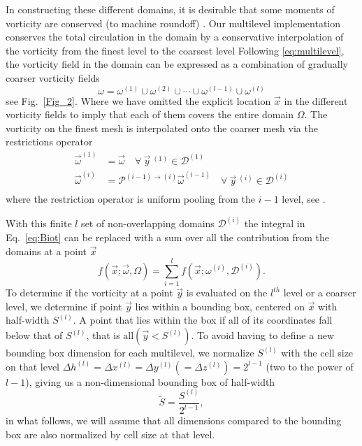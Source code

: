 \documentclass[preprint,12pt]{elsarticle}
\begin{document}
In constructing these different domains, it is desirable that some moments of vorticity are conserved (to machine roundoff) \cite{Colonius2008}. Our multilevel implementation conserves the total circulation in the domain by a conservative interpolation of the vorticity from the finest level to the coarsest level
Following \ref{eq:multilevel}, the vorticity field in the domain can be expressed as a combination of gradually coarser vorticity fields
\begin{equation}
    \omega = \omega^{(1)} \cup \omega^{(2)} \cup \cdots \cup \omega^{(l-1)} \cup \omega^{(l)}
\end{equation}
see Fig.~\ref{Fig_2}. Where we have omitted the explicit location $\vec x$ in the different vorticity fields to imply that each of them covers the entire domain $\Omega$. The vorticity on the finest mesh is interpolated onto the coarser mesh via the restrictions operator
\begin{equation}
    \begin{split}
        \vec{\omega}^{(1)} &= \vec{\omega} \quad \forall\ \vec{y}\ ^{(1)} \in \mathcal{D}^{(1)}\\
        \vec{\omega}^{(i)} &= \mathcal{P}^{(i-1)\to(i)}\vec{\omega}^{(i-1)} \quad \forall\  \vec{y}\ ^{(i)} \in \mathcal{D}^{(i)}\\
    \end{split}
\end{equation}
where the restriction operator is uniform pooling from the $i-1$ level, see \cite{Weymouth2022Data-drivenProjection}.

With this finite $l$ set of non-overlapping domains $\mathcal{D}^{(i)}$ the integral in Eq.~\ref{eq:Biot} can be replaced with a sum over all the contribution from the domains at a point $\vec x$
\begin{equation}\label{eq:biot_sum}
    f(\vec{x}; \vec{\omega},\Omega) = \sum_{i=1}^{l} f(\vec{x}; \omega^{(i)},\mathcal{D}^{(i)}).
\end{equation}
To determine if the vorticity at a point $\vec y$ is evaluated on the $l^{th}$ level or a coarser level, we determine if point $\vec y$ lies within a bounding box, centered on $\vec x$ with half-width $S^{(l)}$. A point that lies within the box if all of its coordinates fall below that of $S^{(l)}$, that is $\text{all}(\vec{y}<{S}^{(l)})$. To avoid having to define a new bounding box dimension for each multilevel, we normalize ${S}^{(l)}$ with the cell size on that level $\Delta h^{(l)} = \Delta x^{(l)} = \Delta y^{(l)} (= \Delta z^{(l)}) = 2^{l-1}$ (two to the power of $l-1$), giving us a non-dimensional bounding box of half-width 
\begin{equation}\label{eq:bbox}
    \tilde{S} = \frac{{S}^{(l)}}{2^{l-1}},
\end{equation}
in what follows, we will assume that all dimensions compared to the bounding box are also normalized by cell size at that level.
\end{document}
